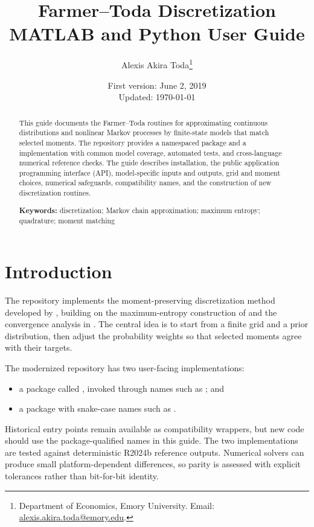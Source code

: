 \title{Farmer--Toda Discretization\\
\large MATLAB and Python User Guide}
\author{Alexis Akira Toda\thanks{Department of Economics, Emory University.
Email: \href{mailto:alexis.akira.toda@emory.edu}{alexis.akira.toda@emory.edu}.}}
\date{First version: June 2, 2019\\Updated: \today}


\maketitle

\begin{abstract}
This guide documents the Farmer--Toda routines for approximating continuous
distributions and nonlinear Markov processes by finite-state models that match
selected moments. The repository provides a namespaced \matlab{} package and a
\python{} implementation with common model coverage, automated tests, and
cross-language numerical reference checks. The guide describes installation,
the public application programming interface (API), model-specific inputs and
outputs, grid and moment choices, numerical safeguards, compatibility names,
and the construction of new discretization routines.

\medskip
\noindent\textbf{Keywords:} discretization; Markov chain approximation;
maximum entropy; quadrature; moment matching
\end{abstract}

\tableofcontents

\section{Introduction}

The \pkg{} repository implements the moment-preserving discretization method
developed by \textcite{FarmerToda2017QE}, building on the maximum-entropy
construction of \textcite{TanakaToda2013EL} and the convergence analysis in
\textcite{TanakaToda2015SINUM}. The central idea is to start from a finite grid
and a prior distribution, then adjust the probability weights so that selected
moments agree with their targets.

The modernized repository has two user-facing implementations:
\begin{itemize}
  \item a \matlab{} package called , invoked through
  names such as ; and
  \item a \python{} package with snake-case names such as
  .
\end{itemize}
Historical \matlab{} entry points remain available as compatibility wrappers,
but new code should use the package-qualified names in this guide. The two
implementations are tested against deterministic \matlab{} R2024b reference
outputs. Numerical solvers can produce small platform-dependent differences,
so parity is assessed with explicit tolerances rather than bit-for-bit
identity.

